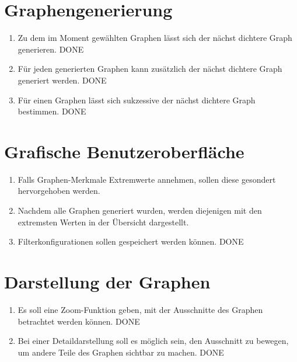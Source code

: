 \documentclass[13pt]{scrreprt}
\begin{document}
\section{Graphengenerierung}
\begin{addmargin}[25pt]{0pt}
	\begin{enumerate}[label=FA\arabic*,start=303]
		\item Zu dem im Moment gewählten Graphen lässt sich der nächst dichtere Graph generieren. DONE
		\item Für jeden generierten Graphen kann zusätzlich der nächst dichtere Graph generiert werden. DONE
		\item Für einen Graphen lässt sich sukzessive der nächst dichtere Graph bestimmen. DONE
	\end{enumerate}
\end{addmargin}

\section{Grafische Benutzeroberfläche}
\begin{addmargin}[25pt]{0pt}
	\begin{enumerate} [label=FA\arabic*,start=404]
		\item Falls Graphen-Merkmale Extremwerte annehmen, sollen diese gesondert hervorgehoben werden.
		\item Nachdem alle Graphen generiert wurden, werden diejenigen mit den extremsten Werten in der Übersicht dargestellt.
		\item Filterkonfigurationen sollen gespeichert werden können. DONE
	\end{enumerate}
\end{addmargin}

\section{Darstellung der Graphen}
\begin{addmargin}[25pt]{0pt}
	\begin{enumerate} [label=FA\arabic*,start=503]
		\item \label{FA503}Es soll eine Zoom-Funktion geben, mit der Ausschnitte des Graphen betrachtet werden können. DONE
		\item \label{FA504}Bei einer Detaildarstellung soll es möglich sein, den Ausschnitt zu bewegen, um andere Teile des Graphen sichtbar zu machen. DONE
	\end{enumerate}
\end{addmargin}
\end{document}
